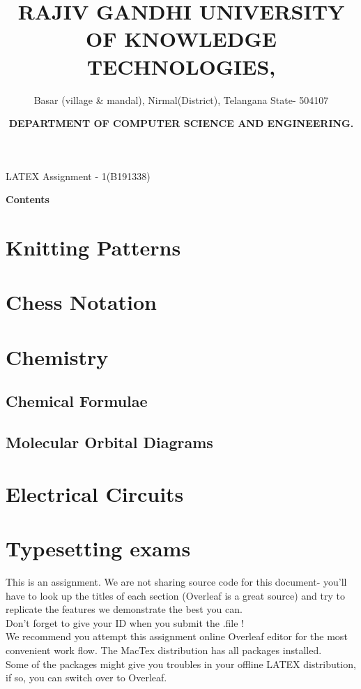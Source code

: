 \documentclass{knittingpattern}
\title{\color{blue}\centering\large\textbf{RAJIV GANDHI UNIVERSITY OF KNOWLEDGE TECHNOLOGIES,}}
\author{\color{blue}\centering\normalsize Basar (village \& mandal), Nirmal(District), Telangana State- 504107 }
\date{ \color{red}\centering \large \textbf{DEPARTMENT OF COMPUTER SCIENCE AND ENGINEERING.}}
\begin{document}
\maketitle
\hline
\vspace{0.5 cm}
\centering
\large{LATEX Assignment - 1(B191338)}
\\
\begin{flushleft}
\Large\textbf{Contents}
\section{Knitting Patterns}
\section{Chess Notation}
\section{Chemistry}
\subsection{Chemical Formulae}
\subsection{Molecular Orbital Diagrams}
\section{Electrical Circuits}
\section{Typesetting exams}
\end{flushleft}
\raggedright
This is an assignment. We are not sharing source code for this document- you'll have to look up the titles of each section (Overleaf is a great source) and try to replicate the features we demonstrate the best you can.\\
\medskip
Don't forget to give your ID when you submit the .file !\\
\medskip
We recommend you attempt this assignment online Overleaf editor for the most convenient work flow. The MacTex distribution has all packages installed.\\
\medskip
Some of the packages might give you troubles in your offline LATEX distribution, if so, you can switch over to Overleaf.\\
\bigskip
\bigskip
\centering
{}
\newpage
{}
\end{document}

